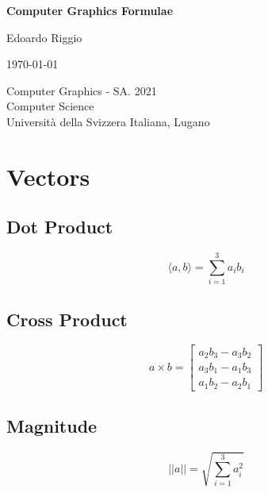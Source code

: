 \documentclass{article}
\begin{document}
\begin{titlepage}
    \begin{center}
        \vspace*{1cm}
        
        \Huge
        \textbf{Computer Graphics Formulae}
        
        \vspace{0.5cm}
        \LARGE
        
        \vspace{.5cm}
        
        Edoardo Riggio
   		  \vspace{1.5cm}
       
        \vfill
        
        \today
        
        \vspace{.8cm}
          \Large
          Computer Graphics - SA. 2021 \\
        Computer Science\\
        Universit\`{a} della Svizzera Italiana, Lugano\\
        
    \end{center}
\end{titlepage}

\tableofcontents

\newpage

\section{Vectors}
\subsection{Dot Product}
\vspace{.3cm}
\[ \langle a, b \rangle = \sum^3_{i=1} a_i b_i \]

\subsection{Cross Product}
\vspace{.3cm}
\[ a \times b = \begin{bmatrix} a_2b_3 - a_3b_2 \\ a_3b_1 - a_1b_3 \\ a_1b_2 - a_2b_1 \end{bmatrix} \]

\subsection{Magnitude}
\vspace{.3cm}
\[ ||a|| = \sqrt{\sum^3_{i=1} a_i^2} \]
\end{document}

